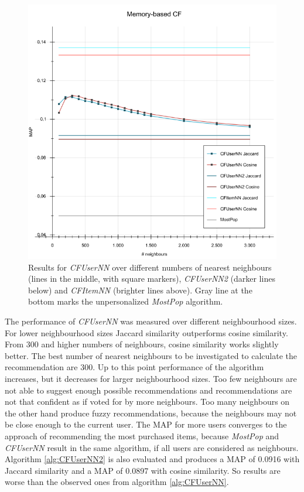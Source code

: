 \documentclass[10pt]{reportMaster}
\begin{document}
\begin{figure}[h!]
	\centering
	\includegraphics[width=1\textwidth]{figures/experiments/MemoryBasedCF}
	\caption[Results for memory-based collaborative filtering algorithms]{Results for \textit{CFUserNN} over different numbers of nearest neighbours (lines in the middle, with square markers), \textit{CFUserNN2} (darker lines below) and \textit{CFItemNN} (brighter lines above). Gray line at the bottom marks the unpersonalized \textit{MostPop} algorithm.}
	\label{fig:memBasedCF}
\end{figure}

The performance of \textit{CFUserNN} was measured over different neighbourhood sizes.
For lower neighbourhood sizes Jaccard similarity outperforms cosine similarity.
From 300 and higher numbers of neighbours, cosine similarity works slightly better.
The best number of nearest neighbours to be investigated to calculate the recommendation are 300.
Up to this point performance of the algorithm increases, but it decreases for larger neighbourhood sizes.
Too few neighbours are not able to suggest enough possible recommendations and recommendations are not that confident as if voted for by more neighbours.
Too many neighbours on the other hand produce fuzzy recommendations, because the neighbours may not be close enough to the current user.
The MAP for more users converges to the approach of recommending the most purchased items, because \textit{MostPop} and \textit{CFUserNN} result in the same algorithm, if all users are considered as neighbours.
Algorithm \ref{alg:CFUserNN2} is also evaluated and produces a MAP of 0.0916 with Jaccard similarity and a MAP of 0.0897 with cosine similarity.
So results are worse than the observed ones from algorithm \ref{alg:CFUserNN}.
\end{document}
